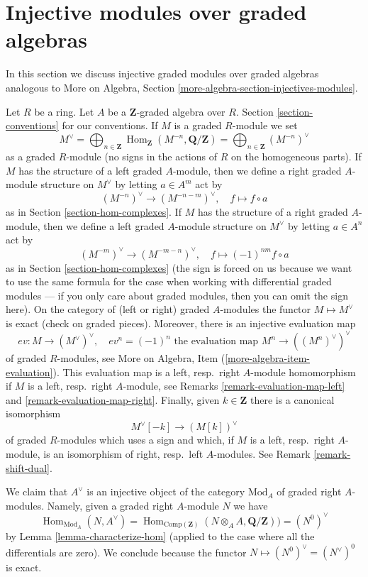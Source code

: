\documentclass{stacks-project}
\theoremstyle{plain}
\theoremstyle{definition}
\theoremstyle{remark}
\numberwithin{equation}{subsection}
\def\Hom{\mathop{\mathrm{Hom}}\nolimits}
\begin{document}
\section{Injective modules over graded algebras}
\label{section-modules-noncommutative-graded}

\noindent
In this section we discuss injective graded modules over graded algebras
analogous to
More on Algebra, Section \ref{more-algebra-section-injectives-modules}.

\medskip\noindent
Let $R$ be a ring. Let $A$ be a $\mathbf{Z}$-graded algebra over $R$.
Section \ref{section-conventions} for our conventions.
If $M$ is a graded $R$-module we set
$$
M^\vee =
\bigoplus\nolimits_{n \in \mathbf{Z}}
\Hom_\mathbf{Z}(M^{-n}, \mathbf{Q}/\mathbf{Z}) =
\bigoplus\nolimits_{n \in \mathbf{Z}} (M^{-n})^\vee
$$
as a graded $R$-module (no signs in the actions of $R$ on the
homogeneous parts). If $M$ has the structure of a left graded
$A$-module, then we define a right graded $A$-module structure
on $M^\vee$ by letting $a \in A^m$ act by
$$
(M^{-n})^\vee \to (M^{-n - m})^\vee, \quad
f \mapsto f \circ a
$$
as in Section \ref{section-hom-complexes}.
If $M$ has the structure of a right graded
$A$-module, then we define a left graded $A$-module structure
on $M^\vee$ by letting $a \in A^n$ act by
$$
(M^{-m})^\vee \to (M^{-m - n})^\vee, \quad
f \mapsto (-1)^{nm}f \circ a
$$
as in Section \ref{section-hom-complexes} (the sign is forced on
us because we want to use the same formula for the case
when working with differential graded modules --- if you only
care about graded modules, then you can omit the sign here).
On the category of (left or right) graded $A$-modules the
functor $M \mapsto M^\vee$ is exact (check on graded pieces).
Moreover, there is an injective evaluation map
$$
ev : M \longrightarrow (M^\vee)^\vee, \quad
ev^n = (-1)^n \text{ the evaluation map }M^n \to ((M^n)^\vee)^\vee
$$
of graded $R$-modules, see
More on Algebra, Item (\ref{more-algebra-item-evaluation}).
This evaluation map is a left, resp.\ right $A$-module homomorphism
if $M$ is a left, resp.\ right $A$-module, see
Remarks \ref{remark-evaluation-map-left} and \ref{remark-evaluation-map-right}.
Finally, given $k \in \mathbf{Z}$ there is a canonical isomorphism
$$
M^\vee[-k] \longrightarrow (M[k])^\vee
$$
of graded $R$-modules which uses a sign and which, if
$M$ is a left, resp.\ right $A$-module, is an isomorphism
of right, resp.\ left $A$-modules. See Remark \ref{remark-shift-dual}.

\medskip\noindent
We claim that $A^\vee$ is an injective object of the category
$\text{Mod}_A$ of graded right $A$-modules. Namely, given a graded
right $A$-module $N$ we have
$$
\Hom_{\text{Mod}_A}(N, A^\vee) =
\Hom_{\text{Comp}(\mathbf{Z})}(N \otimes_A A, \mathbf{Q}/\mathbf{Z})) =
(N^0)^\vee
$$
by Lemma \ref{lemma-characterize-hom}
(applied to the case where all the differentials are zero).
We conclude because the functor $N \mapsto (N^0)^\vee = (N^\vee)^0$
is exact.
\end{document}
